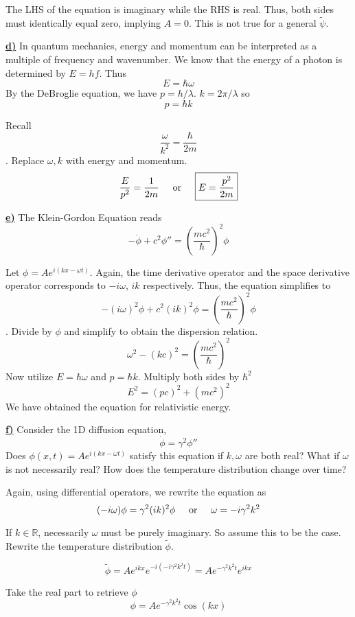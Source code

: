 \documentclass{article}
\newcommand{\new}[1]{
    \vspace{2mm}
    \noindent
    \textbf{
    \underline{#1}}
}
\newcommand{\textOr}{
    {
        \hspace{5mm}
        \textrm{or}
        \hspace{5mm}
    }
}
\newcommand{\Ixp}[1]{
    {
        e^{i{#1}}
    }
}
\begin{document}
The LHS of the equation is imaginary while the RHS is real. 
Thus, both sides must identically equal zero, implying $A = 0$. 
This is not true for a general $\tilde\psi$. \lightning

\new{d)} In quantum mechanics, energy and momentum can be interpreted 
as a multiple of frequency and wavenumber. We know that the 
energy of a photon is determined by $E = hf$. Thus 
\[
    E = \hbar \omega
\]
By the DeBroglie equation, we have $p = h/\lambda$. $k = 2\pi / \lambda$ 
so 
\[
    p = \hbar k
    \] 

Recall 
\[
    \frac \omega {k^2} = \frac \hbar {2m}
\]
. Replace $\omega, k$ with energy and momentum.
\[
    \frac E {p^2} = \frac 1 {2m} 
    \textOr 
    \boxed{
        E = \frac{p^2}{2m}
    }
\]

\new{e)} The Klein-Gordon Equation reads 
\[
    -\ddot\phi + c^2 \phi '' =
    \left(
        \frac {mc^2} \hbar
    \right)^2 
    \phi
\]

Let $\phi = A\Ixp{(kx - \omega t)}$. Again, the 
time derivative operator and the space derivative operator 
corresponds to $-i\omega$, $ik$ respectively. Thus, the equation 
simplifies to 
\[
    -(i\omega)^2 \phi + c^2 (ik)^2 \phi = \left(
        \frac {mc^2} \hbar
    \right)^2 
    \phi
\]. 
Divide by $\phi$ and simplify to obtain the dispersion relation. 
\[
    \omega^2 - (kc)^2 = \left(
        \frac {mc^2} \hbar
    \right)^2 
\]
Now utilize $E = \hbar \omega$ and $p = \hbar k$. Multiply both sides by $\hbar^2 $
\[
    E^2 = (pc)^2 + (mc^2)^2
\]
We have obtained the equation for relativistic energy. 

\new{f)} Consider the 1D diffusion equation, 
\[
    \dot \phi = \gamma^2 \phi ''
\]
Does $\phi(x, t) = A\Ixp{(kx - \omega t)}$ satisfy this equation 
if $k, \omega$ are both real? What if $\omega$ is not necessarily real? 
How does the temperature distribution change over time?

Again, using differential operators, we rewrite the equation as 
\[
   (-i\omega) \phi = \gamma^2 (ik)^2   \phi
   \textOr 
   \omega = -i\gamma^2k^2
\]

If $k\in \mathbb{R}$, necessarily $\omega$ must be purely imaginary. So 
assume this to be the case. Rewrite the temperature distribution $\tilde \phi$. 

\[
    \tilde \phi = A \Ixp{kx} e^{-i(-i\gamma^2k^2t)} = Ae^{-\gamma^2k^2t} e^{ikx} 
\]

Take the real part to retrieve $\phi$
\[
    \phi =  Ae^{-\gamma^2k^2t} \cos(kx)
\]
\end{document}

